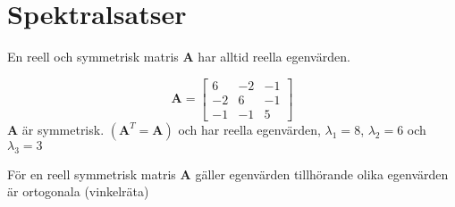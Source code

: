 \section{Spektralsatser} %
\label{sec:spektralsatser}
\begin{sats}
	En reell och symmetrisk matris \textbf{A} har alltid reella egenvärden.
\end{sats}
\begin{Ex}
	\[
	\mathbf{A} =
	\begin{bmatrix}
		6 & -2 & -1\\
		-2 & 6 & -1\\
		-1 & -1 & 5
	\end{bmatrix}
	\]
	\textbf{A} är symmetrisk. $(\mathbf{A}^T = \mathbf{A})$ och har reella egenvärden, $\lambda_1 = 8$, $\lambda_2 = 6$ och $\lambda_3 = 3$
\end{Ex}
\begin{sats}
	För en reell symmetrisk matris \textbf{A} gäller egenvärden tillhörande olika egenvärden är ortogonala (vinkelräta)
\end{sats}

